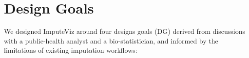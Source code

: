 \documentclass{egpubl}
\newcommand{\tool}{ImputeViz\xspace}
\begin{document}


\section{Design Goals}
We designed \tool around four designs goals (DG) derived from discussions with a public-health analyst and a bio-statistician, and informed by the limitations of existing imputation workflows:
\end{document}
